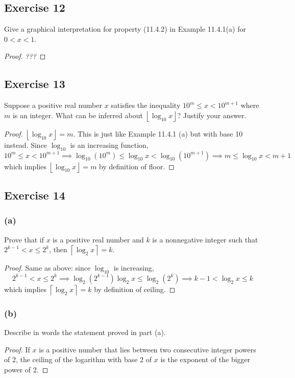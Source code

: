 \documentclass[14pt]{extarticle}
\newcommand{\floor}[1]{{\left\lfloor#1\right\rfloor}}
\newcommand{\ceil}[1]{{\left\lceil#1\right\rceil}}
\begin{document}
\subsection{Exercise 12}
Give a graphical interpretation for property (11.4.2) in Example 11.4.1(a) for \(0 < x < 1\).

\begin{proof}
{\it ???}
\end{proof}

\subsection{Exercise 13}
Suppose a positive real number \(x\) satisfies the inequality \(10^m \leq x < 10^{m+1}\) where \(m\) is an integer. What can 
be inferred about \(\floor{\log_{10} x}\)? Justify your answer.

\begin{proof}
\(\floor{\log_{10} x} = m\). This is just like Example 11.4.1 (a) but with base 10 instead. Since \(\log_{10}\) is an 
increasing function, 
\[
10^m \leq x < 10^{m+1} \implies \log_{10}(10^m) \leq \log_{10}x < \log_{10}(10^{m+1}) \implies m \leq \log_{10}x < m+1
\]
which implies \(\floor{\log_{10} x} = m\) by definition of floor.
\end{proof}

\subsection{Exercise 14}
\subsubsection{(a)}
Prove that if \(x\) is a positive real number and \(k\) is a nonnegative integer such that \(2^{k-1} < x \leq 2^k\), then 
\(\ceil{\log_2 x} = k\).

\begin{proof}
Same as above: since \(\log_{10}\) is increasing,
\[
2^{k-1} < x \leq 2^k \implies \log_{2}(2^{k-1}) \log_2 x \leq  \log_2(2^k) \implies k-1 < \log_2 x \leq k
\]
which implies \(\ceil{\log_2 x} = k\) by definition of ceiling.
\end{proof}

\subsubsection{(b)}
Describe in words the statement proved in part (a).

\begin{proof}
If \(x\) is a positive number that lies between two consecutive integer powers of 2, the ceiling of the logarithm with base 2 of \(x\) is the exponent of the bigger power of 2. 
\end{proof}
\end{document}
